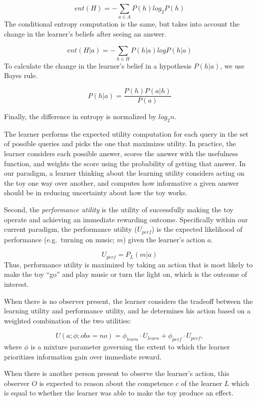 \documentclass[10pt, letterpaper]{article}
\begin{document}
\[ent(H) = -\sum_{a\in A}{P(h)log_2P(h)}\] \noindent
The conditional entropy computation is the same, but takes into account
the change in the learner's beliefs after seeing an answer.

\[ ent(H|a) = -\sum_{h\in H}{P(h|a)logP(h|a)} \] \noindent
To calculate the change in the learner's belief in a hypothesis
\(P(h|a)\), we use Bayes rule.

\[ P(h|a) = \frac{P(h)P(a|h)}{P(a)} \]

\noindent
Finally, the difference in entropy is normalized by \(log_2 n\).

The learner performs the expected utility computation for each query in
the set of possible queries and picks the one that maximizes utility. In
practice, the learner considers each possible answer, scores the answer
with the usefulness function, and weights the score using the
probability of getting that answer. In our paradigm, a learner thinking
about the learning utility considers acting on the toy one way over
another, and computes how informative a given answer should be in
reducing uncertainty about how the toy works.

Second, the \emph{performance utility} is the utility of successfully
making the toy operate and achieving an immediate rewarding outcome.
Specifically within our current paradigm, the performance utility
(\(U_{perf}\)) is the expected likelihood of performance (e.g.~turning
on music; \(m\)) given the learner's action \(a\).

\[ U_{perf} = P_L(m | a) \] \noindent
Thus, performance utility is maximized by taking an action that is most
likely to make the toy ``go'' and play music or turn the light on, which
is the outcome of interest.

When there is no observer present, the learner considers the tradeoff
between the learning utility and performance utility, and he determines
his action based on a weighted combination of the two utilities:

\[ U(a;\phi; obs = no) = \phi_{learn} \cdot U_{learn} + \phi_{perf} \cdot U_{perf} ,\]
\noindent
where \(\phi\) is a mixture parameter governing the extent to which the
learner prioritizes information gain over immediate reward.

When there is another person present to observe the learner's action,
this observer \(O\) is expected to reason about the competence \(c\) of
the learner \(L\) which is equal to whether the learner was able to make
the toy produce an effect.
\end{document}
